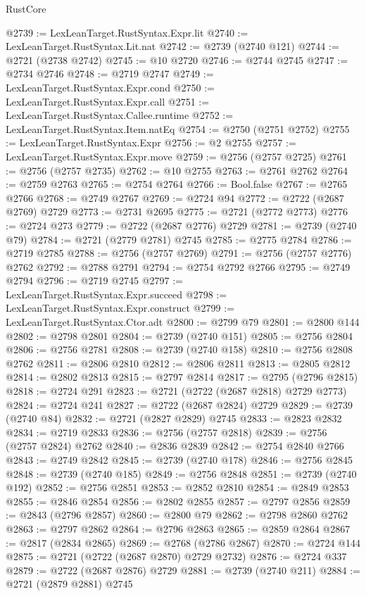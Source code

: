 \begin{lexlean}{RustCore}
\begin{coremodule}
@2739 := LexLeanTarget.RustSyntax.Expr.lit
@2740 := LexLeanTarget.RustSyntax.Lit.nat
@2742 := @2739 (@2740 @121)
@2744 := @2721 (@2738 @2742)
@2745 := @10 @2720
@2746 := @2744 @2745
@2747 := @2734 @2746
@2748 := @2719 @2747
@2749 := LexLeanTarget.RustSyntax.Expr.cond
@2750 := LexLeanTarget.RustSyntax.Expr.call
@2751 := LexLeanTarget.RustSyntax.Callee.runtime
@2752 := LexLeanTarget.RustSyntax.Item.natEq
@2754 := @2750 (@2751 @2752)
@2755 := LexLeanTarget.RustSyntax.Expr
@2756 := @2 @2755
@2757 := LexLeanTarget.RustSyntax.Expr.move
@2759 := @2756 (@2757 @2725)
@2761 := @2756 (@2757 @2735)
@2762 := @10 @2755
@2763 := @2761 @2762
@2764 := @2759 @2763
@2765 := @2754 @2764
@2766 := Bool.false
@2767 := @2765 @2766
@2768 := @2749 @2767
@2769 := @2724 @94
@2772 := @2722 (@2687 @2769) @2729
@2773 := @2731 @2695
@2775 := @2721 (@2772 @2773)
@2776 := @2724 @273
@2779 := @2722 (@2687 @2776) @2729
@2781 := @2739 (@2740 @79)
@2784 := @2721 (@2779 @2781) @2745
@2785 := @2775 @2784
@2786 := @2719 @2785
@2788 := @2756 (@2757 @2769)
@2791 := @2756 (@2757 @2776) @2762
@2792 := @2788 @2791
@2794 := @2754 @2792 @2766
@2795 := @2749 @2794
@2796 := @2719 @2745
@2797 := LexLeanTarget.RustSyntax.Expr.succeed
@2798 := LexLeanTarget.RustSyntax.Expr.construct
@2799 := LexLeanTarget.RustSyntax.Ctor.adt
@2800 := @2799 @79
@2801 := @2800 @144
@2802 := @2798 @2801
@2804 := @2739 (@2740 @151)
@2805 := @2756 @2804
@2806 := @2756 @2781
@2808 := @2739 (@2740 @158)
@2810 := @2756 @2808 @2762
@2811 := @2806 @2810
@2812 := @2806 @2811
@2813 := @2805 @2812
@2814 := @2802 @2813
@2815 := @2797 @2814
@2817 := @2795 (@2796 @2815)
@2818 := @2724 @291
@2823 := @2721 (@2722 (@2687 @2818) @2729 @2773)
@2824 := @2724 @241
@2827 := @2722 (@2687 @2824) @2729
@2829 := @2739 (@2740 @84)
@2832 := @2721 (@2827 @2829) @2745
@2833 := @2823 @2832
@2834 := @2719 @2833
@2836 := @2756 (@2757 @2818)
@2839 := @2756 (@2757 @2824) @2762
@2840 := @2836 @2839
@2842 := @2754 @2840 @2766
@2843 := @2749 @2842
@2845 := @2739 (@2740 @178)
@2846 := @2756 @2845
@2848 := @2739 (@2740 @185)
@2849 := @2756 @2848
@2851 := @2739 (@2740 @192)
@2852 := @2756 @2851
@2853 := @2852 @2810
@2854 := @2849 @2853
@2855 := @2846 @2854
@2856 := @2802 @2855
@2857 := @2797 @2856
@2859 := @2843 (@2796 @2857)
@2860 := @2800 @79
@2862 := @2798 @2860 @2762
@2863 := @2797 @2862
@2864 := @2796 @2863
@2865 := @2859 @2864
@2867 := @2817 (@2834 @2865)
@2869 := @2768 (@2786 @2867)
@2870 := @2724 @144
@2875 := @2721 (@2722 (@2687 @2870) @2729 @2732)
@2876 := @2724 @337
@2879 := @2722 (@2687 @2876) @2729
@2881 := @2739 (@2740 @211)
@2884 := @2721 (@2879 @2881) @2745

\end{coremodule}
\end{lexlean}
